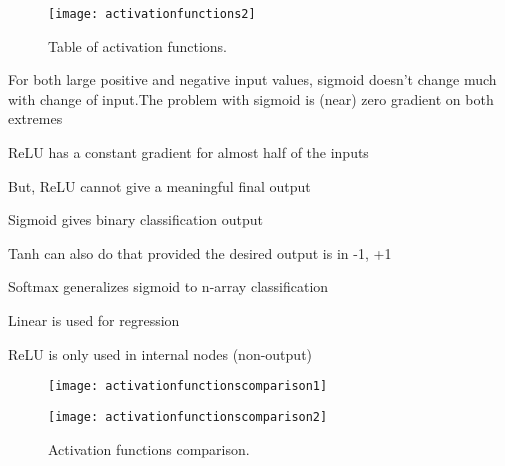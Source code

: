  	\begin{figure}[h]
		\centering
		\texttt{[image: activationfunctions2]}
		\caption[Table of activation functions]{Table of activation functions.}
		\label{fig:activationfunctions2}
	\end{figure}


	\begin{bulletedlist}
		\item For both large positive and negative input values, sigmoid doesn't change much with change of input.The problem with sigmoid is (near) zero gradient on both extremes
		\item ReLU has a constant gradient for almost half of the inputs
		\item But, ReLU cannot give a meaningful final output
		\item Sigmoid gives binary classification output
		\item Tanh can also do that provided the desired output is in {-1, +1}
		\item Softmax generalizes sigmoid to n-array classification
		\item Linear is used for regression
		\item ReLU is only used in internal nodes (non-output)
	\end{bulletedlist}



 	\begin{figure}[h]
		\begin{minipage}[t]{0.48\textwidth}
			\centering
			\texttt{[image: activationfunctionscomparison1]}
		\end{minipage}
		\hfill
		\begin{minipage}[t]{0.48\textwidth}
			\centering
			\texttt{[image: activationfunctionscomparison2]}
		\end{minipage}
		\caption[Activation functions comparison]{Activation functions comparison.}
		\label{fig:activationfunctionscomparison}
	\end{figure}


